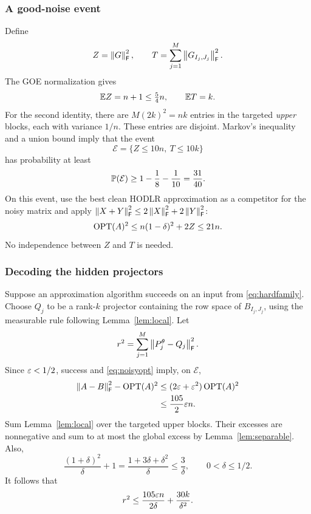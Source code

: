\subsubsection{A good-noise event}

Define
\[
 Z=\left\lVert G\right\rVert_{\mathsf F}^2,\qquad
 T=\sum_{j=1}^M\left\lVert G_{I_j,J_j}\right\rVert_{\mathsf F}^2.
\]
The GOE normalization gives
\[
 \mathbb E Z=n+1\le\tfrac54n,\qquad \mathbb E T=k.
\]
For the second identity, there are $M(2k)^2=nk$ entries in the targeted
\emph{upper} blocks, each with variance $1/n$. These entries are disjoint.
Markov's inequality and a union bound imply that the event
\begin{equation}\label{eq:event}
 \mathcal E=\{Z\le10n,\ T\le10k\}
\end{equation}
has probability at least
\begin{equation}\label{eq:eventprob}
 \mathbb P(\mathcal E)\ge1-\frac18-\frac1{10}=\frac{31}{40}.
\end{equation}
On this event, use the best clean HODLR approximation as a competitor for the
noisy matrix and apply $\left\lVert X+Y\right\rVert_{\mathsf F}^2\le2\left\lVert X\right\rVert_{\mathsf F}^2+2\left\lVert Y\right\rVert_{\mathsf F}^2$:
\begin{equation}\label{eq:noisyopt}
 \operatorname{OPT}(A)^2\le n(1-\delta)^2+2Z\le21n.
\end{equation}
No independence between $Z$ and $T$ is needed.

\subsubsection{Decoding the hidden projectors}

Suppose an approximation algorithm succeeds on an input from
\eqref{eq:hardfamily}. Choose $Q_j$ to be a rank-$k$ projector containing the
row space of $B_{I_j,J_j}$, using the measurable rule following
Lemma~\ref{lem:local}. Let
\[
 r^2=\sum_{j=1}^M\left\lVert P_j^\theta-Q_j\right\rVert_{\mathsf F}^2.
\]
Since $\varepsilon<1/2$, success and \eqref{eq:noisyopt} imply, on $\mathcal E$,
\begin{align}\label{eq:globalexcess}
 \left\lVert A-B\right\rVert_{\mathsf F}^2-\operatorname{OPT}(A)^2
 &\le (2\varepsilon+\varepsilon^2)\operatorname{OPT}(A)^2\notag\\
 &\le\frac{105}{2}\varepsilon n.
\end{align}
Sum Lemma~\ref{lem:local} over the targeted upper blocks. Their excesses are
nonnegative and sum to at most the global excess by
Lemma~\ref{lem:separable}. Also,
\[
 \frac{(1+\delta)^2}{\delta}+1
 =\frac{1+3\delta+\delta^2}{\delta}\le\frac3\delta,
 \qquad 0<\delta\le1/2.
\]
It follows that
\begin{equation}\label{eq:radius}
 r^2\le\frac{105\varepsilon n}{2\delta}+\frac{30k}{\delta^2}.
\end{equation}

